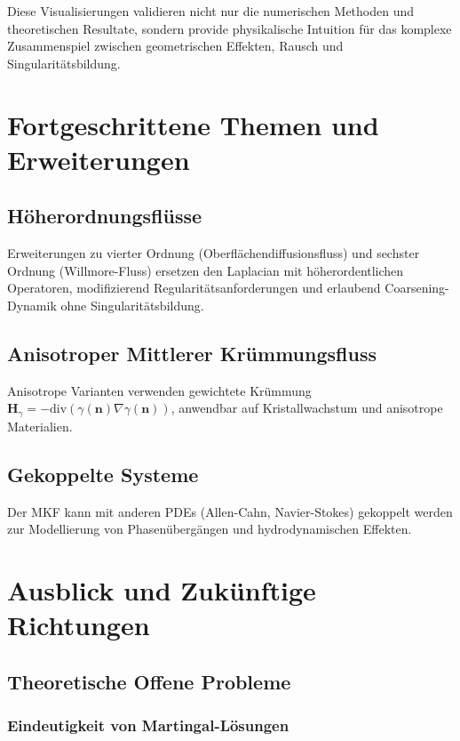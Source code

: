 \documentclass[a4paper,12pt]{article}
\theoremstyle{definition}
\begin{document}
Diese Visualisierungen validieren nicht nur die numerischen Methoden und theoretischen Resultate, sondern provide physikalische Intuition für das komplexe Zusammenspiel zwischen geometrischen Effekten, Rausch und Singularitätsbildung.

\section{Fortgeschrittene Themen und Erweiterungen}
\label{sec:advanced}

\subsection{Höherordnungsflüsse}

Erweiterungen zu vierter Ordnung (Oberflächendiffusionsfluss) und sechster Ordnung (Willmore-Fluss) ersetzen den Laplacian mit höherordentlichen Operatoren, modifizierend Regularitätsanforderungen und erlaubend Coarsening-Dynamik ohne Singularitätsbildung.

\subsection{Anisotroper Mittlerer Krümmungsfluss}

Anisotrope Varianten verwenden gewichtete Krümmung $\mathbf{H}_\gamma = -\text{div}(\gamma(\mathbf{n})\nabla\gamma(\mathbf{n}))$, anwendbar auf Kristallwachstum und anisotrope Materialien.

\subsection{Gekoppelte Systeme}

Der MKF kann mit anderen PDEs (Allen-Cahn, Navier-Stokes) gekoppelt werden zur Modellierung von Phasenübergängen und hydrodynamischen Effekten.

\section{Ausblick und Zukünftige Richtungen}
\label{sec:outlook}

\subsection{Theoretische Offene Probleme}

\subsubsection{Eindeutigkeit von Martingal-Lösungen}
\end{document}
